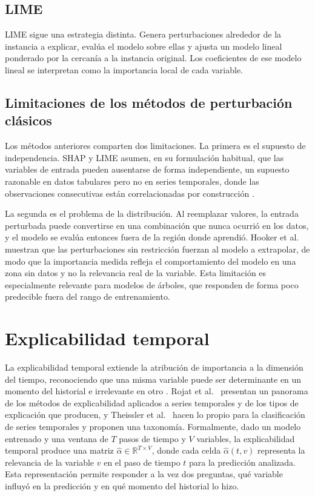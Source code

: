 \subsection{LIME}

LIME \cite{ribeiro2016} sigue una estrategia distinta. Genera perturbaciones alrededor de la instancia a explicar, evalúa el modelo sobre ellas y ajusta un modelo lineal ponderado por la cercanía a la instancia original. Los coeficientes de ese modelo lineal se interpretan como la importancia local de cada variable.

\subsection{Limitaciones de los métodos de perturbación clásicos}

Los métodos anteriores comparten dos limitaciones. La primera es el supuesto de independencia. SHAP y LIME asumen, en su formulación habitual, que las variables de entrada pueden ausentarse de forma independiente, un supuesto razonable en datos tabulares pero no en series temporales, donde las observaciones consecutivas están correlacionadas por construcción \cite{tonekaboni2020}.

La segunda es el problema de la distribución. Al reemplazar valores, la entrada perturbada puede convertirse en una combinación que nunca ocurrió en los datos, y el modelo se evalúa entonces fuera de la región donde aprendió. Hooker et al.\ \cite{hooker2021} muestran que las perturbaciones sin restricción fuerzan al modelo a extrapolar, de modo que la importancia medida refleja el comportamiento del modelo en una zona sin datos y no la relevancia real de la variable. Esta limitación es especialmente relevante para modelos de árboles, que responden de forma poco predecible fuera del rango de entrenamiento.

\section{Explicabilidad temporal}
\label{sec:mt_temporal}

La explicabilidad temporal extiende la atribución de importancia a la dimensión del tiempo, reconociendo que una misma variable puede ser determinante en un momento del historial e irrelevante en otro \cite{tonekaboni2020}. Rojat et al.\ \cite{rojat2021} presentan un panorama de los métodos de explicabilidad aplicados a series temporales y de los tipos de explicación que producen, y Theissler et al.\ \cite{theissler2022} hacen lo propio para la clasificación de series temporales y proponen una taxonomía. Formalmente, dado un modelo entrenado y una ventana de $T$ pasos de tiempo y $V$ variables, la explicabilidad temporal produce una matriz $\hat{\alpha} \in \mathbb{R}^{T \times V}$, donde cada celda $\hat{\alpha}(t, v)$ representa la relevancia de la variable $v$ en el paso de tiempo $t$ para la predicción analizada. Esta representación permite responder a la vez dos preguntas, qué variable influyó en la predicción y en qué momento del historial lo hizo.

